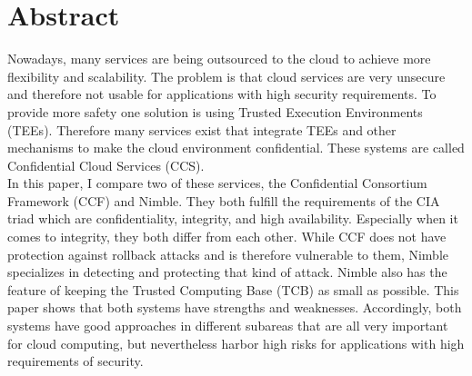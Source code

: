 \section*{Abstract}	
 Nowadays, many services are being outsourced to the cloud to achieve more flexibility and scalability. The problem is that cloud services are very unsecure and therefore not usable for applications with high security requirements. To provide more safety one solution is using Trusted Execution Environments (TEEs). Therefore many services exist that integrate TEEs and other mechanisms to make the cloud environment confidential. These systems are called Confidential Cloud Services (CCS).\\
  In this paper, I compare two of these services, the Confidential Consortium Framework (CCF) and Nimble. They both fulfill the requirements of the CIA triad which are confidentiality, integrity, and high availability. Especially when it comes to integrity, they both differ from each other. While CCF does not have protection against rollback attacks and is therefore vulnerable to them, Nimble specializes in detecting and protecting that kind of attack. Nimble also has the feature of keeping the Trusted Computing Base (TCB) as small as possible. This paper shows that both systems have strengths and weaknesses. %
  Accordingly, both systems have good approaches in different subareas that are all very important for cloud computing, but nevertheless harbor high risks for applications with high requirements of security.\\